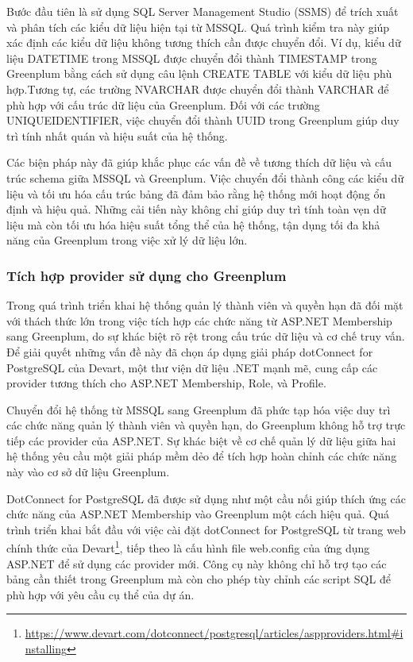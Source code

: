\documentclass{article}[14pt]
\begin{document}
Bước đầu tiên là sử dụng SQL Server Management Studio (SSMS) để trích xuất và phân tích các kiểu dữ liệu hiện tại từ MSSQL. Quá trình kiểm tra này giúp xác định các kiểu dữ liệu không tương thích cần được chuyển đổi. Ví dụ, kiểu dữ liệu DATETIME trong MSSQL được chuyển đổi thành TIMESTAMP trong Greenplum bằng cách sử dụng câu lệnh CREATE TABLE với kiểu dữ liệu phù hợp.Tương tự, các trường NVARCHAR được chuyển đổi thành VARCHAR để phù hợp với cấu trúc dữ liệu của Greenplum. Đối với các trường UNIQUEIDENTIFIER, việc chuyển đổi thành UUID trong Greenplum giúp duy trì tính nhất quán và hiệu suất của hệ thống.

Các biện pháp này đã giúp khắc phục các vấn đề về tương thích dữ liệu và cấu trúc schema giữa MSSQL và Greenplum. Việc chuyển đổi thành công các kiểu dữ liệu và tối ưu hóa cấu trúc bảng đã đảm bảo rằng hệ thống mới hoạt động ổn định và hiệu quả. Những cải tiến này không chỉ giúp duy trì tính toàn vẹn dữ liệu mà còn tối ưu hóa hiệu suất tổng thể của hệ thống, tận dụng tối đa khả năng của Greenplum trong việc xử lý dữ liệu lớn.

\subsubsection{Tích hợp provider sử dụng cho Greenplum}

Trong quá trình triển khai hệ thống quản lý thành viên và quyền hạn đã đối mặt với thách thức lớn trong việc tích hợp các chức năng từ ASP.NET Membership sang Greenplum, do sự khác biệt rõ rệt trong cấu trúc dữ liệu và cơ chế truy vấn. Để giải quyết những vấn đề này đã chọn áp dụng giải pháp dotConnect for PostgreSQL của Devart, một thư viện dữ liệu .NET mạnh mẽ, cung cấp các provider tương thích cho ASP.NET Membership, Role, và Profile.


Chuyển đổi hệ thống từ MSSQL sang Greenplum đã phức tạp hóa việc duy trì các chức năng quản lý thành viên và quyền hạn, do Greenplum không hỗ trợ trực tiếp các provider của ASP.NET. Sự khác biệt về cơ chế quản lý dữ liệu giữa hai hệ thống yêu cầu một giải pháp mềm dẻo để tích hợp hoàn chỉnh các chức năng này vào cơ sở dữ liệu Greenplum.

DotConnect for PostgreSQL đã được sử dụng như một cầu nối giúp thích ứng các chức năng của ASP.NET Membership vào Greenplum một cách hiệu quả. Quá trình triển khai bắt đầu với việc cài đặt dotConnect for PostgreSQL từ trang web chính thức của Devart\footnote{\url{https://www.devart.com/dotconnect/postgresql/articles/aspproviders.html#installing}}, tiếp theo là cấu hình file web.config của ứng dụng ASP.NET để sử dụng các provider mới. Công cụ này không chỉ hỗ trợ tạo các bảng cần thiết trong Greenplum mà còn cho phép tùy chỉnh các script SQL để phù hợp với yêu cầu cụ thể của dự án.
\end{document}
